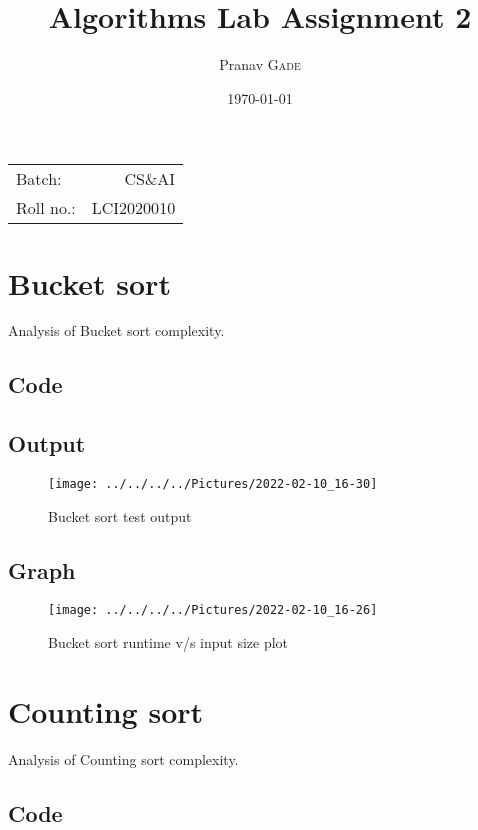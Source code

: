 \documentclass{article}
\title{Algorithms Lab Assignment 2} %
\author{Pranav \textsc{Gade}} %
\date{\today} %
\begin{document}
    \maketitle %

    \begin{center}
        \begin{tabular}{l r}
            Batch:    & CS\&AI     \\
            Roll no.: & LCI2020010
        \end{tabular}
    \end{center}


    \section{Bucket sort}
    Analysis of Bucket sort complexity.
    \subsection{Code}
    

    \subsection{Output}
    \begin{figure}[H]
        \centering
        \texttt{[image: ../../../../Pictures/2022-02-10\_16-30]}
        \caption{Bucket sort test output}
    \end{figure}

    \subsection{Graph}
    \begin{figure}[H]
        \centering
        \texttt{[image: ../../../../Pictures/2022-02-10\_16-26]}
        \caption{Bucket sort runtime v/s input size plot}
    \end{figure}

    \section{Counting sort}
    Analysis of Counting sort complexity.
    \subsection{Code}
    
\end{document}
